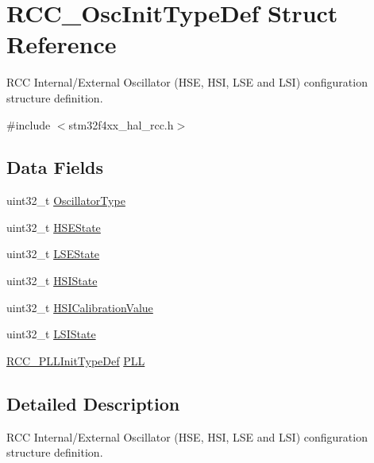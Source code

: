 \hypertarget{struct_r_c_c___osc_init_type_def}{}\section{R\+C\+C\+\_\+\+Osc\+Init\+Type\+Def Struct Reference}
\label{struct_r_c_c___osc_init_type_def}


R\+CC Internal/\+External Oscillator (H\+SE, H\+SI, L\+SE and L\+SI) configuration structure definition.  




{\ttfamily \#include $<$stm32f4xx\+\_\+hal\+\_\+rcc.\+h$>$}

\subsection*{Data Fields}
\begin{DoxyCompactItemize}
\item 
uint32\+\_\+t \mbox{\hyperlink{struct_r_c_c___osc_init_type_def_a23b9d1da2a92936c618d2416406275a3}{Oscillator\+Type}}
\item 
uint32\+\_\+t \mbox{\hyperlink{struct_r_c_c___osc_init_type_def_ad499b1bbeeb8096235b534a9bfa53c9d}{H\+S\+E\+State}}
\item 
uint32\+\_\+t \mbox{\hyperlink{struct_r_c_c___osc_init_type_def_abb72dd5bfb99667e36d99b6887f80a0a}{L\+S\+E\+State}}
\item 
uint32\+\_\+t \mbox{\hyperlink{struct_r_c_c___osc_init_type_def_a49183e0be5cf522de0fa1968df0bf0d7}{H\+S\+I\+State}}
\item 
uint32\+\_\+t \mbox{\hyperlink{struct_r_c_c___osc_init_type_def_ad28b977e258a3ee788cd6c2d72430c30}{H\+S\+I\+Calibration\+Value}}
\item 
uint32\+\_\+t \mbox{\hyperlink{struct_r_c_c___osc_init_type_def_a9acc15f6278f950ef02d5d6f819f68e8}{L\+S\+I\+State}}
\item 
\mbox{\hyperlink{struct_r_c_c___p_l_l_init_type_def}{R\+C\+C\+\_\+\+P\+L\+L\+Init\+Type\+Def}} \mbox{\hyperlink{struct_r_c_c___osc_init_type_def_a7ec4025786fa81e2a4bfc42832c0eddf}{P\+LL}}
\end{DoxyCompactItemize}


\subsection{Detailed Description}
R\+CC Internal/\+External Oscillator (H\+SE, H\+SI, L\+SE and L\+SI) configuration structure definition. 

